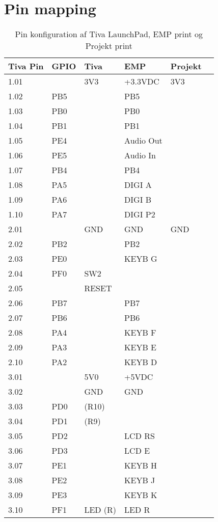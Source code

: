\chapter{Pin mapping} \label{bilag:pinmap}
\begin{table}[h!]
	\caption{Pin konfiguration af Tiva LaunchPad, EMP print og Projekt print}
	\label{tab:pin_mapping}
	\begin{threeparttable}
		\begin{tabular}{l l l l l l}
			\toprule
			\textbf{Tiva Pin\tnote{a}} 	& 
			\textbf{GPIO\tnote{b}}  	&
			\textbf{Tiva\tnote{c}} 		& 
			\textbf{EMP\tnote{d}}  		&
			\textbf{Projekt\tnote{e}} 	\\ 
			\midrule
			1.01 &      & 3V3  	& +3.3VDC		& 3V3			 		\\
			1.02 &  PB5 &      	& PB5			&  		\\
			1.03 &	PB0 &	   	& PB0			&								\\
			1.04 &	PB1 &      	& PB1			&								\\
			1.05 &	PE4 &	   	& Audio Out     &							\\
			1.06 &	PE5 &	   	& Audio In		&								\\
			1.07 &	PB4 &	   	& PB4			& 		\\
			1.08 &	PA5 &	   	& DIGI A		& 					\\
			1.09 &	PA6 &	   	& DIGI B    	& 								\\
			1.10 &	PA7 &	   	& DIGI P2		& 								\\
			\midrule
			2.01 &     	& GND  	& GND  			&  GND 						\\
			2.02 & PB2 	&      	& PB2			&								\\
			2.03 & PE0 	&	  	& KEYB G 		&								\\
			2.04 & PF0 	& SW2	& 				&								\\
			2.05 &     	& RESET	& 				&								\\
			2.06 & PB7	&		& PB7			& 					\\
			2.07 & PB6	&		& PB6			& 					\\
			2.08 & PA4 	&      	& KEYB F 		&						\\
			2.09 & PA3 	&		& KEYB E    	& 						\\
			2.10 & PA2  &		& KEYB D		& 						\\
			\midrule
			3.01 &		& 5V0	& +5VDC			&								\\
			3.02 &		& GND	& GND			&								\\
			3.03 & PD0	&(R10)	&				&								\\
			3.04 & PD1	&(R9)	&				&								\\
			3.05 & PD2	&		& LCD RS		& 				\\
			3.06 & PD3	&		& LCD E			& 						\\
			3.07 & PE1	&		& KEYB H		& 							\\
			3.08 & PE2	&		& KEYB J		&							\\
			3.09 & PE3	&		& KEYB K		&								\\
			3.10 & PF1	&LED (R)& LED R			&								\\
			\bottomrule
		\end{tabular}
	

\end{threeparttable}
\end{table}
